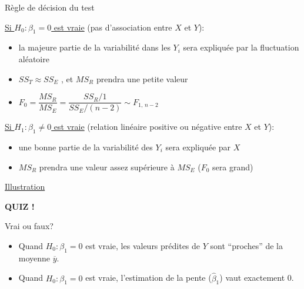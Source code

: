 \documentclass{BeamerTemplate}
\begin{document}
\begin{frame}[t]{Règle de décision du test}

{\small
\underline{Si $H_0: \beta_1=0$ est vraie} (pas d'association entre $X$ et $Y$):
 \begin{itemize}
 \item \alert{la majeure partie de la variabilité dans les $Y_i$ sera expliquée par la fluctuation aléatoire}
\item $SS_T\approx SS_E$ , et $MS_R$ prendra une petite valeur


\item $F_0=\dfrac{MS_R}{MS_E}=\dfrac{SS_{R}/1}{SS_E/(n-2)}\sim F_{1,\,n-2}$
\end{itemize}

\medskip
\underline{Si $H_1: \beta_1\ne0$ est vraie} (relation linéaire positive ou négative entre $X$ et $Y$):

 \begin{itemize}
 \item \alert{une bonne partie de la variabilité des $Y_i$ sera expliquée par $X$}
 \item $MS_R$ prendra une  valeur assez supérieure à $MS_E$ ($F_0$ sera grand)
\end{itemize}

{}
}

\href{https://jmiron-anova.share.connect.posit.cloud/}{Illustration}

\end{frame}

\begin{frame}[t]{ }

\centerline{\LARGE\bf \alert{QUIZ !}}
\bigskip

Vrai ou faux?

\bigskip
\begin{itemize}\itemsep15mm
 \item Quand $H_0: \beta_1=0$ est vraie, les valeurs prédites de $Y$ sont ``proches'' de la moyenne $\overline y$.

\item Quand $H_0: \beta_1=0$ est vraie, l'estimation de la pente ($\hat\beta_1$) vaut exactement 0.
\end{itemize}


\end{frame}
\end{document}
